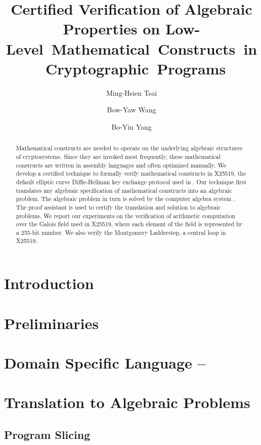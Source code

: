 \documentclass{llncs}
\title{Certified Verification of Algebraic Properties on
Low- \mbox{Level Mathematical Constructs in Cryptographic Programs}}
\author{
Ming-Hsien Tsai
\and
Bow-Yaw Wang
\and
Bo-Yin Yang
%
}
\institute
{
Institute of Information Science\\
Academia Sinica\\
128 Section 2 Academia Road, Taipei 115-29, Taiwan\\
\email{mhtsai208@gmail.com, bywang@iis.sinica.edu.tw, by@crypto.tw}
}
\author{\vspace*{-1cm}}
\institute{\vspace*{-1cm}\ }
\begin{document}
\maketitle

\begin{abstract}
  Mathematical constructs are needed to operate
  on the underlying algebraic structures of cryptosystems. 
  Since they are invoked most frequently, these mathematical constructs
  are written in assembly languages and often optimized manually. We
  develop a certified technique to formally verify mathematical
  constructs in X25519, the default elliptic curve Diffie-Hellman key
  exchange protocol used in \openssh. Our technique first translates any
  algebraic specification of mathematical constructs into an algebraic
  problem. The algebraic 
  problem in turn is solved by the computer algebra system \singular. 
  The proof assistant 
  \coq is used to certify the translation and solution to algebraic
  problems. We report our experiments on the verification of
  arithmetic computation over the Galois field used in X25519, where
  each element of the field is represented by a 255-bit number. We
  also verify the Montgomery Ladderstep, a central loop  in X25519.
\end{abstract}

\section{Introduction}
\label{section:introduction}


\section{Preliminaries}
\label{section:preliminaries}


\section{Domain Specific Language -- \mydsl}
\label{section:domain-specific-language}


\section{Translation to Algebraic Problems}
\label{section:translation}


\subsection{Program Slicing}
\label{subsection:translation:slicing}

\end{document}
